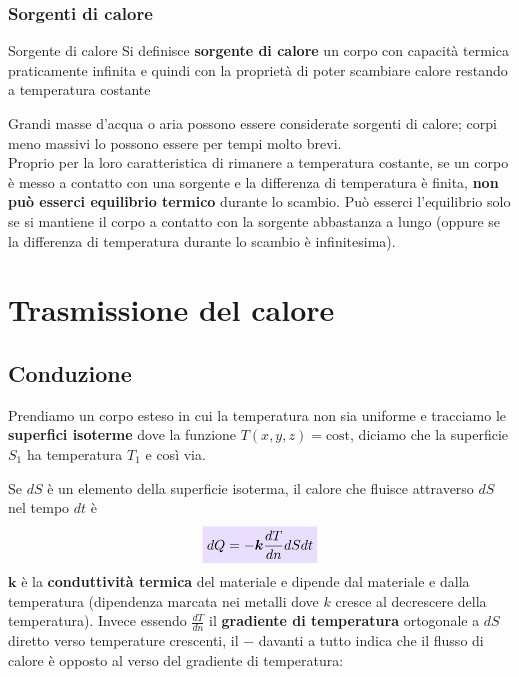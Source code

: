 \documentclass[x11names]{report}
\newcommand{\viola}[1]{\colorbox{yred}{$\displaystyle #1$}}
\begin{document}
\subsubsection{Sorgenti di calore}
\begin{center}
	\colorbox{yblue}{\begin{minipage}{5.75in}
			\begin{blues}{Sorgente di calore}
				Si definisce \textbf{sorgente di calore} un corpo con capacità termica praticamente infinita e quindi con la proprietà di poter scambiare calore restando a temperatura costante
			\end{blues}
	\end{minipage}}
\end{center}
Grandi masse d'acqua o aria possono essere considerate sorgenti di calore; corpi meno massivi lo possono essere per tempi molto brevi.\\

\noindent
Proprio per la loro caratteristica di rimanere a temperatura costante, se un corpo è messo a contatto con una sorgente e la differenza di temperatura è finita, \textbf{non può esserci equilibrio termico} durante lo scambio. Può esserci l'equilibrio solo se si mantiene il corpo a contatto con la sorgente abbastanza a lungo (oppure se la differenza di temperatura durante lo scambio è infinitesima).


\section{Trasmissione del calore}

\subsection{Conduzione}
Prendiamo un corpo esteso in cui la temperatura non sia uniforme e tracciamo le \textbf{superfici isoterme} dove la funzione \(T(x,y,z) = \text{cost}\), diciamo che la superficie \(S_1\) ha temperatura \(T_1\) e così via. 

Se \(dS\) è un elemento della superficie isoterma, il calore che fluisce attraverso \(dS\) nel tempo \(dt\) è 
\begin{equation}\label{fourier calore}
	\viola{dQ = -\boldsymbol{k} \frac{dT}{dn}dS dt}
\end{equation}
\(\boldsymbol{k}\) è la \textbf{conduttività termica} del materiale e dipende dal materiale e dalla temperatura (dipendenza marcata nei metalli dove \(k\) cresce al decrescere della temperatura). Invece essendo \(\frac{dT}{dn}\) il \textbf{gradiente di temperatura} ortogonale a \(dS\) diretto verso temperature crescenti, il \(\boldsymbol{-}\) davanti a tutto indica che il flusso di calore è opposto al verso del gradiente di temperatura:\\
\end{document}
